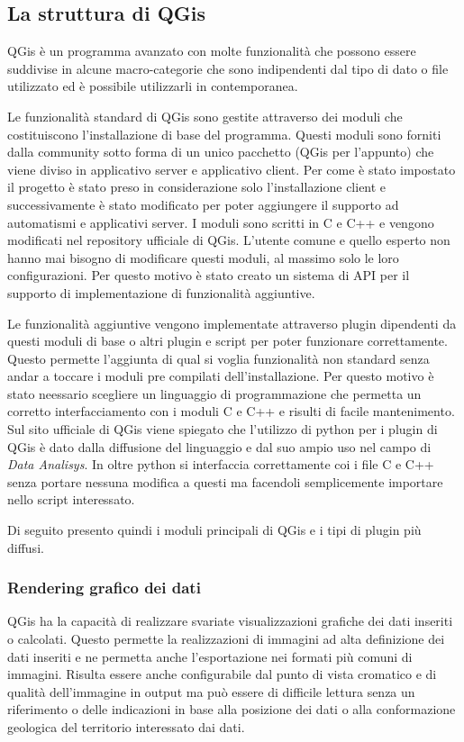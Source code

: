 \subsection{La struttura di QGis}
QGis è un programma avanzato con molte funzionalità che possono essere suddivise in alcune macro-categorie che sono indipendenti dal tipo di dato o file utilizzato ed è possibile utilizzarli in contemporanea.


Le funzionalità standard di QGis sono gestite attraverso dei moduli che costituiscono l'installazione di base del programma. Questi moduli sono forniti dalla community sotto forma di un unico pacchetto (QGis per l'appunto) che viene diviso in applicativo server e applicativo client. Per come è stato impostato il progetto è stato preso in considerazione solo l'installazione client e successivamente è stato modificato per poter aggiungere il supporto ad automatismi e applicativi server. I moduli sono scritti in C e C++ e vengono modificati nel repository ufficiale di QGis. L'utente comune e quello esperto non hanno mai bisogno di modificare questi moduli, al massimo solo le loro configurazioni. Per questo motivo è stato creato un sistema di API per il supporto di implementazione di funzionalità aggiuntive.

Le funzionalità aggiuntive vengono implementate attraverso plugin dipendenti da questi moduli di base o altri plugin e script per poter funzionare correttamente. Questo permette l'aggiunta di qual si voglia funzionalità non standard senza andar a toccare i moduli pre compilati dell'installazione.
Per questo motivo è stato neessario scegliere un linguaggio di programmazione che permetta un corretto interfacciamento con i moduli C e C++ e risulti di facile mantenimento. Sul sito ufficiale di QGis \cite{site:qgis} viene spiegato che l'utilizzo di python per i plugin di QGis è dato dalla diffusione del linguaggio e dal suo ampio uso nel campo di \textit{Data Analisys}. In oltre python si interfaccia correttamente coi i file C e C++ senza portare nessuna modifica a questi ma facendoli semplicemente importare nello script interessato.

Di seguito presento quindi i moduli principali di QGis e i tipi di plugin più diffusi.

\subsubsection{Rendering grafico dei dati}
QGis ha la capacità di realizzare svariate visualizzazioni grafiche dei dati inseriti o calcolati.
Questo permette la realizzazioni di immagini ad alta definizione dei dati inseriti e ne permetta anche l'esportazione nei formati più comuni di immagini. Risulta essere anche configurabile dal punto di vista cromatico e di qualità dell'immagine in output ma può essere di difficile lettura senza un riferimento o delle indicazioni in base alla posizione dei dati o alla conformazione geologica del territorio interessato dai dati.

